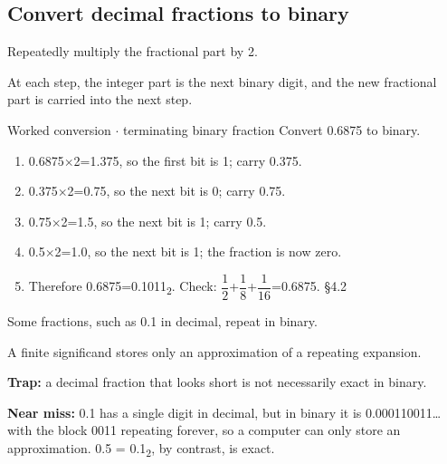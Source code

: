 \documentclass[11pt]{article}
\begin{document}
\begin{keepsection}
\begin{keepsection}
\subsection{Convert decimal fractions to binary}

Repeatedly multiply the fractional part by 2.

At each step, the integer part is the next binary digit, and the new fractional part is carried into the next step.

\begin{workedbox}{Worked conversion \ensuremath{\cdot} terminating binary fraction}
Convert 0.6875 to binary.

\begin{enumerate}
\item 0.6875\ensuremath{\times}2=1.375, so the first bit is 1; carry 0.375.
\item 0.375\ensuremath{\times}2=0.75, so the next bit is 0; carry 0.75.
\item 0.75\ensuremath{\times}2=1.5, so the next bit is 1; carry 0.5.
\item 0.5\ensuremath{\times}2=1.0, so the next bit is 1; the fraction is now zero.
\item Therefore 0.6875=0.1011\textsubscript{2}. Check: {\small\ensuremath{\dfrac{1}{2}}}+{\small\ensuremath{\dfrac{1}{8}}}+{\small\ensuremath{\dfrac{1}{16}}}=0.6875. \hfill{\small\color{FAUblue}§4.2}
\end{enumerate}
\end{workedbox}

Some fractions, such as 0.1 in decimal, repeat in binary.

A finite significand stores only an approximation of a repeating expansion.

\begin{notebox}\textbf{Trap:} a decimal fraction that looks short is not necessarily exact in binary.\end{notebox}

\begin{notebox}\textbf{Near miss:} 0.1 has a single digit in decimal, but in binary it is 0.000110011… with the block 0011 repeating forever, so a computer can only store an approximation. 0.5 = 0.1\textsubscript{2}, by contrast, is exact.\end{notebox}


\end{keepsection}
\end{keepsection}
\end{document}
